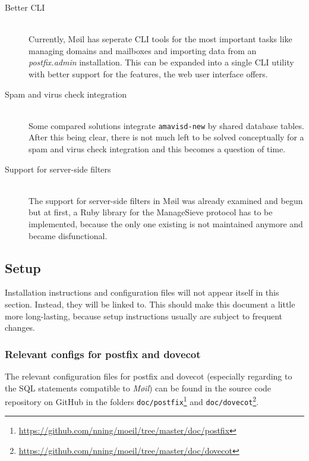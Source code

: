 \documentclass[12pt,a4paper]{scrartcl}
\begin{document}
			\begin{description}
				\item[\rm Better \ac{CLI}]\ \\
					Currently, Møil has seperate \ac{CLI} tools for the most
					important tasks like managing domains and mailboxes and
					importing data from an \emph{postfix.admin} installation.
					This can be expanded into a single \ac{CLI} utility with
					better support for the features, the web user interface
					offers.

				\item[\rm Spam and virus check integration]\ \\
					Some compared solutions integrate \texttt{amavisd-new} by
					shared database tables. After this being clear, there is
					not much left to be solved conceptually for a spam and
					virus check integration and this becomes a question of time.

				\item[\rm Support for server-side filters]\ \\
					The support for server-side filters in Møil was already
					examined and begun but at first, a Ruby library for the
					ManageSieve protocol has to be implemented, because the
					only one existing is not maintained anymore and became
					disfunctional.
			\end{description}

		\subsection{Setup}
			Installation instructions and configuration files will not appear
			itself in this section. Instead, they will be linked to. This
			should make this document a little more long-lasting, because setup
			instructions usually are subject to frequent changes.

			\subsubsection{Relevant configs for postfix and dovecot}
				The relevant configuration files for postfix and dovecot
				(especially regarding to the \ac{SQL} statements compatible to
				\emph{Møil}) can be found in the source code repository on
				GitHub in the folders
				\texttt{doc/postfix}\footnote{\url{https://github.com/nning/moeil/tree/master/doc/postfix}}
				and
				\texttt{doc/dovecot}\footnote{\url{https://github.com/nning/moeil/tree/master/doc/dovecot}}.
\end{document}
